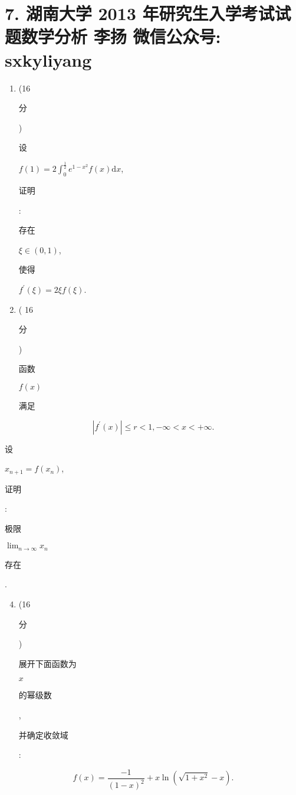 \documentclass[10pt]{article}
\begin{document}
\section{7. 湖南大学 2013 年研究生入学考试试题数学分析 
 李扬 
 微信公众号: sxkyliyang}
\begin{enumerate}
  \item (16 \begin{CJK}{UTF8}{mj}分\end{CJK}) \begin{CJK}{UTF8}{mj}设\end{CJK} $f(1)=2 \int_{0}^{\frac{1}{2}} e^{1-x^{2}} f(x) \mathrm{d} x$, \begin{CJK}{UTF8}{mj}证明\end{CJK}: \begin{CJK}{UTF8}{mj}存在\end{CJK} $\xi \in(0,1)$, \begin{CJK}{UTF8}{mj}使得\end{CJK} $f^{\prime}(\xi)=2 \xi f(\xi)$.

  \item ( 16 \begin{CJK}{UTF8}{mj}分\end{CJK}) \begin{CJK}{UTF8}{mj}函数\end{CJK} $f(x)$ \begin{CJK}{UTF8}{mj}满足\end{CJK}

\end{enumerate}
$$
\left|f^{\prime}(x)\right| \leqslant r<1,-\infty<x<+\infty .
$$
\begin{CJK}{UTF8}{mj}设\end{CJK} $x_{n+1}=f\left(x_{n}\right)$, \begin{CJK}{UTF8}{mj}证明\end{CJK}: \begin{CJK}{UTF8}{mj}极限\end{CJK} $\lim _{n \rightarrow \infty} x_{n}$ \begin{CJK}{UTF8}{mj}存在\end{CJK}.

\begin{enumerate}
  \setcounter{enumi}{3}
  \item (16 \begin{CJK}{UTF8}{mj}分\end{CJK}) \begin{CJK}{UTF8}{mj}展开下面函数为\end{CJK} $x$ \begin{CJK}{UTF8}{mj}的幂级数\end{CJK}, \begin{CJK}{UTF8}{mj}并确定收敛域\end{CJK}:
\end{enumerate}
$$
f(x)=\frac{-1}{(1-x)^{2}}+x \ln \left(\sqrt{1+x^{2}}-x\right) .
$$
\end{document}
